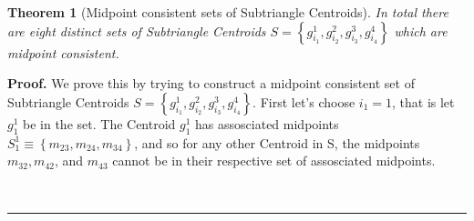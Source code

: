 \documentclass{unswthesis}
\newtheorem{theorem}{Theorem}
\newenvironment{proof}[1][Proof]{\noindent\textbf{#1.} }{\ \rule{0.5em}{0.5em}}
\begin{document}
\begin{theorem}[Midpoint consistent sets of Subtriangle Centroids]
In total there are eight distinct sets of Subtriangle Centroids $S=\left\{
g_{i_{1}}^{1},g_{i_{2}}^{2},g_{i_{3}}^{3},g_{i_{4}}^{4}\right\} $ which are
midpoint consistent.
\end{theorem}

\begin{proof}
We prove this by trying to construct a midpoint consistent set of
Subtriangle Centroids $S=\left\{
g_{i_{1}}^{1},g_{i_{2}}^{2},g_{i_{3}}^{3},g_{i_{4}}^{4}\right\} $. First
let's choose $i_{1}=1$, that is let $g_{1}^{1}$ be in the set. The Centroid $%
g_{1}^{1}$ has assosciated midpoints $S_{1}^{1}\equiv \left\{
m_{23},m_{24},m_{34}\right\} $, and so for any other Centroid in S, the
midpoints $m_{32},m_{42}$, and $m_{43}$ cannot be in their respective set of
assosciated midpoints.


\end{proof}
\end{document}
